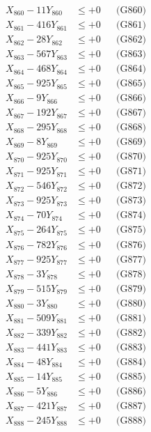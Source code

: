 \documentclass[a4paper,10pt]{article}
\begin{document}
{\begin{align}
X_{860} - 11Y_{860} &\leq +0 && \text{(G860)} \\
\allowbreak
X_{861} - 416Y_{861} &\leq +0 && \text{(G861)} \\
X_{862} - 28Y_{862} &\leq +0 && \text{(G862)} \\
X_{863} - 567Y_{863} &\leq +0 && \text{(G863)} \\
X_{864} - 468Y_{864} &\leq +0 && \text{(G864)} \\
X_{865} - 925Y_{865} &\leq +0 && \text{(G865)} \\
X_{866} - 9Y_{866} &\leq +0 && \text{(G866)} \\
X_{867} - 192Y_{867} &\leq +0 && \text{(G867)} \\
X_{868} - 295Y_{868} &\leq +0 && \text{(G868)} \\
X_{869} - 8Y_{869} &\leq +0 && \text{(G869)} \\
X_{870} - 925Y_{870} &\leq +0 && \text{(G870)} \\
\allowbreak
X_{871} - 925Y_{871} &\leq +0 && \text{(G871)} \\
X_{872} - 546Y_{872} &\leq +0 && \text{(G872)} \\
X_{873} - 925Y_{873} &\leq +0 && \text{(G873)} \\
X_{874} - 70Y_{874} &\leq +0 && \text{(G874)} \\
X_{875} - 264Y_{875} &\leq +0 && \text{(G875)} \\
X_{876} - 782Y_{876} &\leq +0 && \text{(G876)} \\
X_{877} - 925Y_{877} &\leq +0 && \text{(G877)} \\
X_{878} - 3Y_{878} &\leq +0 && \text{(G878)} \\
X_{879} - 515Y_{879} &\leq +0 && \text{(G879)} \\
X_{880} - 3Y_{880} &\leq +0 && \text{(G880)} \\
\allowbreak
X_{881} - 509Y_{881} &\leq +0 && \text{(G881)} \\
X_{882} - 339Y_{882} &\leq +0 && \text{(G882)} \\
X_{883} - 441Y_{883} &\leq +0 && \text{(G883)} \\
X_{884} - 48Y_{884} &\leq +0 && \text{(G884)} \\
X_{885} - 14Y_{885} &\leq +0 && \text{(G885)} \\
X_{886} - 5Y_{886} &\leq +0 && \text{(G886)} \\
X_{887} - 421Y_{887} &\leq +0 && \text{(G887)} \\
X_{888} - 245Y_{888} &\leq +0 && \text{(G888)} \\

\end{align}}
\end{document}
